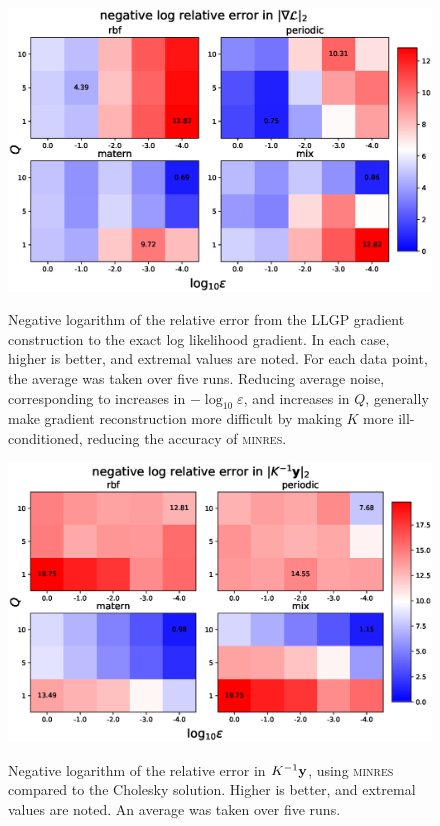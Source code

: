 \documentclass{article}
\begin{document}
\begin{figure}[!ht]
  \centering
{\includegraphics[width=\textwidth]{relgrad_l2.eps}}
\caption{Negative logarithm of the relative error from the LLGP gradient construction to the exact log likelihood gradient. In each case, higher is better, and extremal values are noted.  For each data point, the average was taken over five runs. Reducing average noise, corresponding to increases in $-\log_{10}\varepsilon$, and increases in $Q$, generally make gradient reconstruction more difficult by making $K$ more ill-conditioned, reducing the accuracy of \textsc{minres}.}
\label{fig:relgrad}
\end{figure}

\begin{figure}[!ht]
\centering
{\includegraphics[width=\textwidth]{relalpha_l2.eps}}
\caption{Negative logarithm of the relative error in $K^{-1}\textbf{y}$, using \textsc{minres} compared to the Cholesky solution. Higher is better, and extremal values are noted. An average was taken over five runs.}
\label{fig:rellog}
\end{figure}

\FloatBarrier


\end{document}
